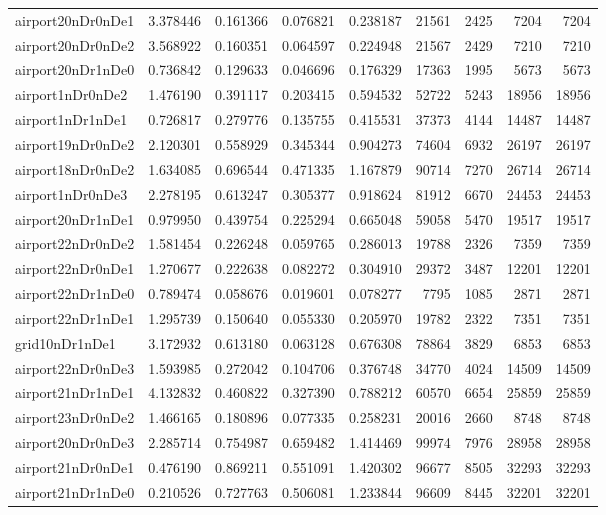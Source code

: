\begin{longtable}{|l|r|r|r|r|r|r|r|r|}
airport20nDr0nDe1 & 3.378446 & 0.161366 & 0.076821 & 0.238187 & 21561 & 2425 & 7204 & 7204 \\
airport20nDr0nDe2 & 3.568922 & 0.160351 & 0.064597 & 0.224948 & 21567 & 2429 & 7210 & 7210 \\
airport20nDr1nDe0 & 0.736842 & 0.129633 & 0.046696 & 0.176329 & 17363 & 1995 & 5673 & 5673 \\
airport1nDr0nDe2 & 1.476190 & 0.391117 & 0.203415 & 0.594532 & 52722 & 5243 & 18956 & 18956 \\
airport1nDr1nDe1 & 0.726817 & 0.279776 & 0.135755 & 0.415531 & 37373 & 4144 & 14487 & 14487 \\
airport19nDr0nDe2 & 2.120301 & 0.558929 & 0.345344 & 0.904273 & 74604 & 6932 & 26197 & 26197 \\
airport18nDr0nDe2 & 1.634085 & 0.696544 & 0.471335 & 1.167879 & 90714 & 7270 & 26714 & 26714 \\
airport1nDr0nDe3 & 2.278195 & 0.613247 & 0.305377 & 0.918624 & 81912 & 6670 & 24453 & 24453 \\
airport20nDr1nDe1 & 0.979950 & 0.439754 & 0.225294 & 0.665048 & 59058 & 5470 & 19517 & 19517 \\
airport22nDr0nDe2 & 1.581454 & 0.226248 & 0.059765 & 0.286013 & 19788 & 2326 & 7359 & 7359 \\
airport22nDr0nDe1 & 1.270677 & 0.222638 & 0.082272 & 0.304910 & 29372 & 3487 & 12201 & 12201 \\
airport22nDr1nDe0 & 0.789474 & 0.058676 & 0.019601 & 0.078277 & 7795 & 1085 & 2871 & 2871 \\
airport22nDr1nDe1 & 1.295739 & 0.150640 & 0.055330 & 0.205970 & 19782 & 2322 & 7351 & 7351 \\
grid10nDr1nDe1 & 3.172932 & 0.613180 & 0.063128 & 0.676308 & 78864 & 3829 & 6853 & 6853 \\
airport22nDr0nDe3 & 1.593985 & 0.272042 & 0.104706 & 0.376748 & 34770 & 4024 & 14509 & 14509 \\
airport21nDr1nDe1 & 4.132832 & 0.460822 & 0.327390 & 0.788212 & 60570 & 6654 & 25859 & 25859 \\
airport23nDr0nDe2 & 1.466165 & 0.180896 & 0.077335 & 0.258231 & 20016 & 2660 & 8748 & 8748 \\
airport20nDr0nDe3 & 2.285714 & 0.754987 & 0.659482 & 1.414469 & 99974 & 7976 & 28958 & 28958 \\
airport21nDr0nDe1 & 0.476190 & 0.869211 & 0.551091 & 1.420302 & 96677 & 8505 & 32293 & 32293 \\
airport21nDr1nDe0 & 0.210526 & 0.727763 & 0.506081 & 1.233844 & 96609 & 8445 & 32201 & 32201 \\

\end{longtable}
